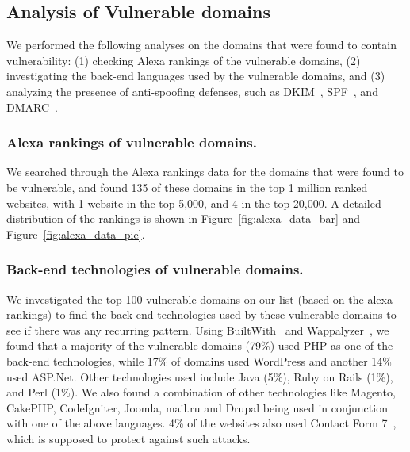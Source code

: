 \vspace{-2.5ex}
\subsection{Analysis of Vulnerable domains}
\vspace{-2.5ex}

We performed the following analyses on the domains
that were found to contain \ehi vulnerability: (1) checking Alexa
rankings of the vulnerable domains, (2) investigating the back-end
languages used by the vulnerable domains, and (3) analyzing the presence
of anti-spoofing defenses, such as DKIM~\cite{allman2007domainkeys},
SPF~\cite{schlitt2006sender}, and DMARC~\cite{kucherawy2015domain}.


\vspace{-1.5ex}
\subsubsection{Alexa rankings of vulnerable domains.}
We searched through the Alexa rankings data\cite{alexa} for the domains that were found to be vulnerable, and found 135 of these domains in the top 1 million ranked websites, with 1 website in the top 5,000, and 4 in the top 20,000. A detailed distribution of the rankings is shown in Figure~\ref{fig:alexa_data_bar} and Figure~\ref{fig:alexa_data_pie}.


\vspace{-1.5ex}

\subsubsection{Back-end technologies of vulnerable domains.}
We investigated the top 100 vulnerable domains on our list (based on the alexa rankings) to find the back-end technologies used by these vulnerable domains to see if there was any recurring pattern. Using BuiltWith~\cite{builtwith} and Wappalyzer~\cite{wappalyzer}, we found that a majority of the vulnerable domains (79\%) used PHP as one of the back-end technologies, while 17\% of domains used WordPress and another 14\% used ASP.Net. Other technologies used include Java (5\%), Ruby on Rails (1\%), and Perl (1\%). We also found a combination of other technologies like Magento, CakePHP, CodeIgniter, Joomla, mail.ru and Drupal being used in conjunction with one of the above languages. 4\% of the websites also used Contact Form 7~\cite{CF7}, which is supposed to protect against such attacks.

